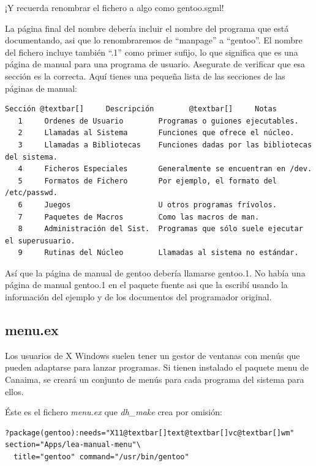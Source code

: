 \documentclass[letterpaper,12pt,spanish]{manual}
\begin{document}
¡Y recuerda renombrar el fichero a algo como gentoo.sgml!

La página final del nombre debería incluir el nombre del programa que está documentando, asi que lo renombraremos de ``manpage'' a ``gentoo''. El nombre del fichero incluye también ``.1'' como primer sufijo, lo que significa que es una página de manual para una programa de usuario. Asegurate de verificar que esa sección es la correcta. Aquí tienes una pequeña lista de las secciones de las páginas de manual:

\begin{Verbatim}[commandchars=@\[\]]
Sección @textbar[]     Descripción        @textbar[]     Notas
   1     Ordenes de Usuario        Programas o guiones ejecutables.
   2     Llamadas al Sistema       Funciones que ofrece el núcleo.
   3     Llamadas a Bibliotecas    Funciones dadas por las bibliotecas del sistema.
   4     Ficheros Especiales       Generalmente se encuentran en /dev.
   5     Formatos de Fichero       Por ejemplo, el formato del /etc/passwd.
   6     Juegos                    U otros programas frívolos.
   7     Paquetes de Macros        Como las macros de man.
   8     Administración del Sist.  Programas que sólo suele ejecutar el superusuario.
   9     Rutinas del Núcleo        Llamadas al sistema no estándar.
\end{Verbatim}

Así que la página de manual de gentoo debería llamarse gentoo.1. No había una página de manual gentoo.1 en el paquete fuente asi que la escribí usando la información del ejemplo y de los documentos del programador original.


\subsection{menu.ex}

Los usuarios de X Windows suelen tener un gestor de ventanas con menús que pueden adaptarse para lanzar programas. Si tienen instalado el paquete menu de Canaima, se creará un conjunto de menús para cada programa del sistema para ellos.

Éste es el fichero \emph{menu.ex} que \emph{dh\_make} crea por omisión:

\begin{Verbatim}[commandchars=@\[\]]
?package(gentoo):needs="X11@textbar[]text@textbar[]vc@textbar[]wm" section="Apps/lea-manual-menu"\
  title="gentoo" command="/usr/bin/gentoo"
\end{Verbatim}
\end{document}
